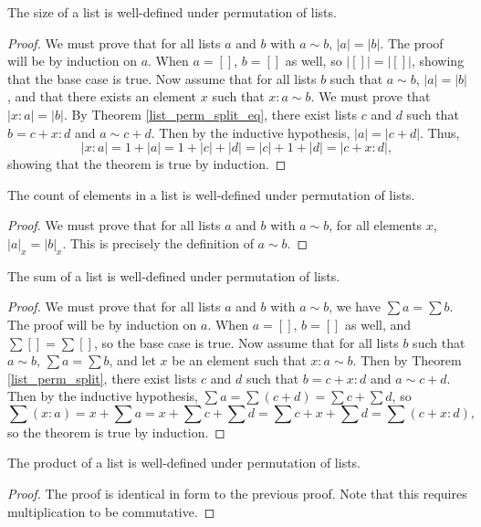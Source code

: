 \documentclass[../math.tex]{subfiles}
\begin{document}
\begin{lemma}
    The size of a list is well-defined under permutation of lists.
\end{lemma}
\begin{proof}
    We must prove that for all lists $a$ and $b$ with $a \sim b$, $|a| = |b|$.
    The proof will be by induction on $a$.  When $a = []$, $b = []$ as well, so
    $|[]| = |[]|$, showing that the base case is true.  Now assume that for all
    lists $b$ such that $a \sim b$, $|a| = |b|$, and that there exists an
    element $x$ such that $x : a \sim b$.  We must prove that $|x : a| = |b|$.
    By Theorem \ref{list_perm_split_eq}, there exist lists $c$ and $d$ such that
    $b = c + x : d$ and $a \sim c + d$.  Then by the inductive hypothesis, $|a|
    = |c + d|$.  Thus,
    \[
        |x : a| = 1 + |a| = 1 + |c| + |d| = |c| + 1 + |d| = |c + x : d|,
    \]
    showing that the theorem is true by induction.
\end{proof}

\begin{lemma}
    The count of elements in a list is well-defined under permutation of lists.
\end{lemma}
\begin{proof}
    We must prove that for all lists $a$ and $b$ with $a \sim b$, for all
    elements $x$, $|a|_x = |b|_x$.  This is precisely the definition of $a \sim
    b$.
\end{proof}

\begin{lemma}
    The sum of a list is well-defined under permutation of lists.
\end{lemma}
\begin{proof}
    We must prove that for all lists $a$ and $b$ with $a \sim b$, we have $\sum
    a = \sum b$.  The proof will be by induction on $a$.  When $a = []$, $b =
    []$ as well, and $\sum [] = \sum []$, so the base case is true.  Now assume
    that for all lists $b$ such that $a \sim b$, $\sum a = \sum b$, and let $x$
    be an element such that $x : a \sim b$.  Then by Theorem
    \ref{list_perm_split}, there exist lists $c$ and $d$ such that $b = c + x :
    d$ and $a \sim c + d$.  Then by the inductive hypothesis, $\sum a = \sum (c
    + d) = \sum c + \sum d$, so
    \[
        \sum (x : a) = x + \sum a = x + \sum c + \sum d = \sum c + x + \sum d
        = \sum (c + x : d),
    \]
    so the theorem is true by induction.
\end{proof}

\begin{lemma}
    The product of a list is well-defined under permutation of lists.
\end{lemma}
\begin{proof}
    The proof is identical in form to the previous proof.  Note that this
    requires multiplication to be commutative.
\end{proof}
\end{document}
